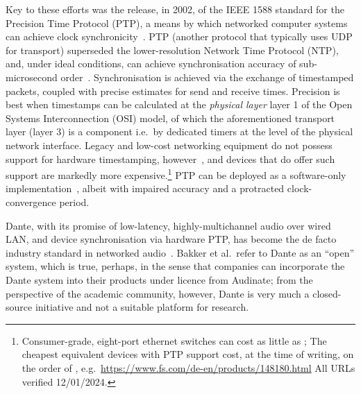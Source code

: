 \documentclass[utf8]{FrontiersinHarvard}
\begin{document}
    Key to these efforts was the release, in 2002, of the IEEE 1588 standard for
    the Precision Time Protocol (PTP), a means by which networked computer
    systems can achieve clock synchronicity~\citep{edison_ieee-1588_2002}.
    PTP (another protocol that typically uses UDP for transport) superseded the
    lower-resolution Network Time Protocol (NTP), and, under ideal conditions,
    can achieve synchronisation accuracy of sub-microsecond
    order~\citep{tongzhou_research_2022}.
    Synchronisation is achieved via the exchange of timestamped packets, coupled
    with precise estimates for send and receive times.
    Precision is best when timestamps can be calculated at the \textit{physical
    layer} \textemdash{} layer 1 of the Open Systems Interconnection (OSI)
    model, of which the aforementioned transport layer (layer 3) is a component
    \textemdash{} i.e.\ by dedicated timers at the level of the physical network
    interface.
    Legacy and low-cost networking equipment do not possess support for hardware
    timestamping, however~\citep{correll_design_2005}, and devices that do offer
    such support are markedly more expensive.\footnote{
        Consumer-grade, eight-port ethernet switches can cost as little as
        ;
        The cheapest equivalent devices with PTP support cost, at the time of
        writing, on the order of , e.g.\
        \url{https://www.fs.com/de-en/products/148180.html} \textemdash{} All
        URLs verified 12/01/2024.
    }
    PTP can be deployed as a software-only
    implementation~\citep{correll_design_2005}, albeit with impaired accuracy
    and a protracted clock-convergence period.

    Dante, with its promise of low-latency, highly-multichannel audio over wired
    LAN, and device synchronisation via hardware PTP, has become the de facto
    industry standard in networked audio~\citep{bakker_introduction_2014}.
    Bakker et al.\ refer to Dante as an ``open'' system, which is true, perhaps,
    in the sense that companies can incorporate the Dante system into their
    products under licence from Audinate;
    from the perspective of the academic community, however, Dante is very much
    a closed-source initiative and not a suitable platform for research.
\end{document}
